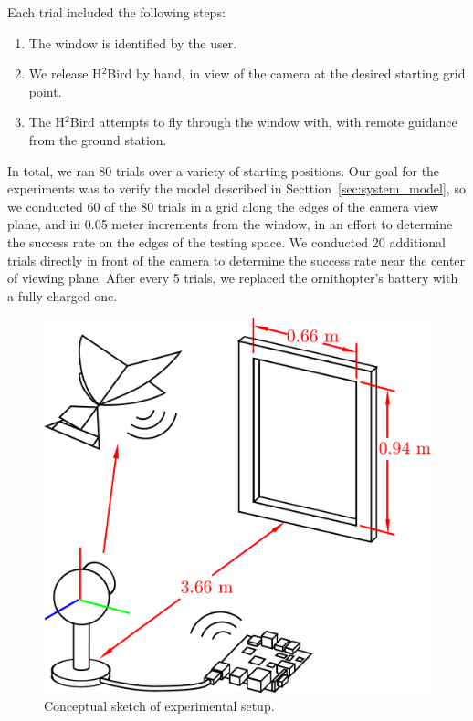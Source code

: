 \documentclass{aamas2013}
\begin{document}
Each trial included the following steps:
\begin{enumerate}
\item The window is identified by the user. 
\item We release H$^2$Bird by hand, in view of the camera at the desired starting grid point.
\item The H$^2$Bird attempts to fly through the window with, with remote guidance from
the ground station.
\end{enumerate}

In total, we ran 80 trials over a variety of starting positions. Our goal for the experiments was to verify the model described in
Secttion~\ref{sec:system_model}, so we conducted 60 of the 80 trials in a grid
along the edges of the camera view plane, and in 0.05 meter increments from the
window, in an effort to determine the success rate on the edges of the testing space. We
conducted 20 additional trials directly in front of the camera to determine
the success rate near the center of viewing plane. After every 5 trials,
we replaced the ornithopter's battery with a fully charged one.

\begin{figure}[tb]
\centering
\includegraphics[width=\linewidth]{figures/experiment_cartoon.pdf}
\caption{Conceptual sketch of experimental setup.}
\label{fig:experiment_cartoon}
\end{figure}
\end{document}
